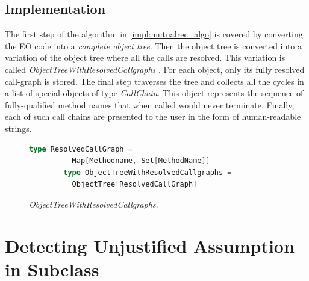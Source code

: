 \subsection{Implementation}
The first step of the algorithm in \ref{impl:mutualrec_algo} is covered by converting the EO code into a \textit{complete object tree}. Then the object tree is converted into a variation of the object tree where all the calls are resolved. This variation is called \textit{ObjectTreeWithResolvedCallgraphs} . For each object, only its fully resolved call-graph is stored. The final step traverses the tree and collects all the cycles in a list of special objects of type \textit{CallChain}. This object represents the sequence of fully-qualified method names that when called would never terminate. Finally, each of such call chains are presented to the user in the form of human-readable strings. 

\begin{figure}
    \begin{lstlisting}[language=Scala]
        type ResolvedCallGraph = 
          Map[Methodname, Set[MethodName]]
        type ObjectTreeWithResolvedCallgraphs =
          ObjectTree[ResolvedCallGraph]
    \end{lstlisting}
    \caption{\textit{ObjectTreeWithResolvedCallgraphs}.}
    \label{fig:mutualrec_program}
\end{figure}

\section{Detecting Unjustified Assumption in Subclass}
\label{impl:unjustified}


